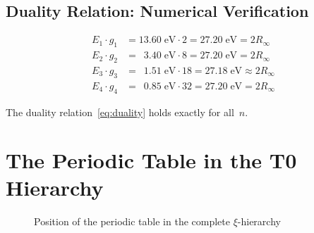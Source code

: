 \subsection{Duality Relation: Numerical Verification}

\begin{align}
  E_1 \cdot g_1 &= 13.60\;\text{eV} \cdot 2  = 27.20\;\text{eV} = 2R_\infty \\
  E_2 \cdot g_2 &= \phantom{0}3.40\;\text{eV} \cdot 8  = 27.20\;\text{eV} = 2R_\infty \\
  E_3 \cdot g_3 &= \phantom{0}1.51\;\text{eV} \cdot 18 = 27.18\;\text{eV} \approx 2R_\infty \\
  E_4 \cdot g_4 &= \phantom{0}0.85\;\text{eV} \cdot 32 = 27.20\;\text{eV} = 2R_\infty
\end{align}

The duality relation~\eqref{eq:duality} holds exactly for all~$n$.

\section{The Periodic Table in the T0 Hierarchy}
\label{sec:hierarchy}

\begin{figure}[htbp]
\centering
{}
\caption{Position of the periodic table in the complete $\xi$-hierarchy}
\label{fig:hierarchy}
\end{figure}

